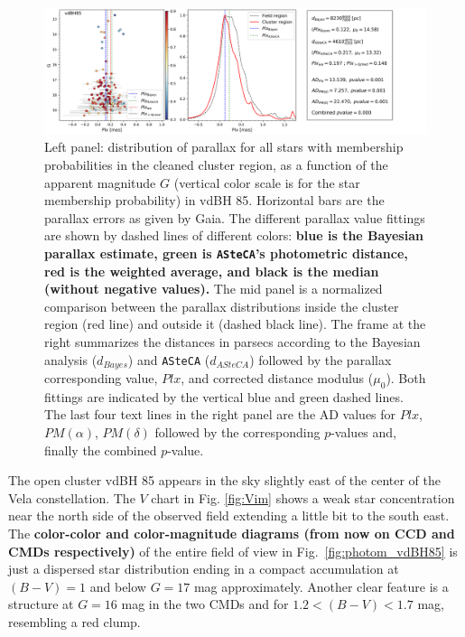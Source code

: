 \documentclass[referee]{aa}
\begin{document}
\begin{figure}[ht]
    \centering
    \includegraphics[width=\hsize]{../figs/plx_vdBH85.png}
\caption{Left panel: distribution of parallax for all stars with membership
probabilities in the cleaned cluster region, as a function of the apparent
magnitude $G$ (vertical color scale is for the star membership
probability) in vdBH 85.
Horizontal bars are the parallax errors as given by Gaia. The different
parallax value fittings are shown by dashed lines of different colors:
\textbf{blue is the Bayesian parallax estimate, green is \texttt{ASteCA}'s
photometric distance, red is the weighted average, and black is the median 
(without negative values).
}
The mid panel is a normalized comparison between the parallax
distributions inside the cluster region (red line) and outside it (dashed
black line). The frame at the right summarizes the distances in parsecs
according to the Bayesian analysis ($d_{Bayes}$) and \texttt{ASteCA} ($d_
{ASteCA}$) followed by the parallax corresponding value, $Plx$, and
corrected distance modulus ($\mu_0$). Both fittings are indicated by the
vertical blue and green dashed lines. The last four text lines in the right
panel are the AD values for $Plx$, $PM(\alpha)$, $PM(\delta)$ followed by
the corresponding $p$-values and, finally the combined $p$-value.
}
    \label{fig:plx_bys_vdBH85}
\end{figure}

The open cluster vdBH 85 appears in the sky slightly east of the center of the
Vela constellation. The $V$ chart in Fig. \ref{fig:Vim} shows a weak star
concentration near the north side of the observed field extending a little bit
to the south east. 
%
The \textbf{color-color and color-magnitude diagrams (from now on CCD and CMDs
respectively)} of the entire field of view in Fig.~\ref{fig:photom_vdBH85} is
just a dispersed star distribution ending in a compact accumulation at
$(B-V)=1$ and below $G=17$ mag approximately. Another clear feature is a
structure at $G=16$ mag in the two CMDs and for $1.2<(B-V)<1.7$ mag, resembling
a red clump.\\
\end{document}
